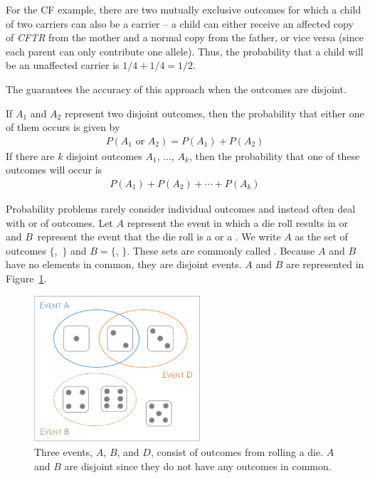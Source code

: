 For the CF example, there are two mutually exclusive outcomes for which a child of two carriers can also be a carrier -- a child can either receive an affected copy of \textit{CFTR} from the mother and a normal copy from the father, or vice versa (since each parent can only contribute one allele). Thus, the probability that a child will be an unaffected carrier is $1/4 + 1/4 = 1/2$.

The  guarantees the accuracy of this approach when the outcomes are disjoint. 

\begin{termBox}{ If $A_1$ and $A_2$ represent two disjoint outcomes, then the probability that either one of them occurs is given by
\begin{eqnarray*}
P(A_1\text{ or } A_2) = P(A_1) + P(A_2)
\end{eqnarray*}
If there are $k$ disjoint outcomes $A_1$, ..., $A_k$, then the probability that one of these outcomes will occur is
\begin{eqnarray}
P(A_1) + P(A_2) + \cdots + P(A_k)
\end{eqnarray}
}
\end{termBox}



Probability problems rarely consider individual outcomes and instead often deal with  or  of outcomes. Let $A$ represent the event in which a die roll results in  or  and $B$~represent the event that the die roll is a  or a . We write $A$ as the set of outcomes $\{$,~$\}$ and $B=\{$, $\}$. These sets are commonly called . Because $A$ and $B$ have no elements in common, they are disjoint events. $A$ and $B$ are represented in Figure~\ref{fig:disjointEvents}.

\begin{figure}[hhh]
\centering
\includegraphics[width=0.55\textwidth]{ch_probability_oi_biostat/figures/disjointEvents/disjointEvents.png}
\caption{Three events, $A$, $B$, and $D$, consist of outcomes from rolling a die. $A$ and $B$ are disjoint since they do not have any outcomes in common.}
\label{fig:disjointEvents}
\end{figure}

